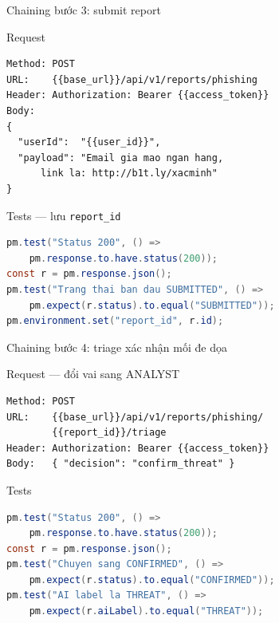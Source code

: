 \documentclass[aspectratio=169,12pt]{beamer}
\begin{document}
\begin{frame}[fragile]{Chaining bước 3: submit report}
  \begin{block}{Request}
\begin{lstlisting}[language={},basicstyle=\ttfamily\scriptsize]
Method: POST
URL:    {{base_url}}/api/v1/reports/phishing
Header: Authorization: Bearer {{access_token}}
Body:
{
  "userId":  "{{user_id}}",
  "payload": "Email gia mao ngan hang,
      link la: http://b1t.ly/xacminh"
}
\end{lstlisting}
  \end{block}

  \begin{block}{Tests --- lưu \texttt{report\_id}}
\begin{lstlisting}[language=Java,basicstyle=\ttfamily\scriptsize]
pm.test("Status 200", () =>
    pm.response.to.have.status(200));
const r = pm.response.json();
pm.test("Trang thai ban dau SUBMITTED", () =>
    pm.expect(r.status).to.equal("SUBMITTED"));
pm.environment.set("report_id", r.id);
\end{lstlisting}
  \end{block}
\end{frame}

\begin{frame}[fragile]{Chaining bước 4: triage xác nhận mối đe dọa}
  \begin{block}{Request --- đổi vai sang ANALYST}
\begin{lstlisting}[language={}]
Method: POST
URL:    {{base_url}}/api/v1/reports/phishing/
        {{report_id}}/triage
Header: Authorization: Bearer {{access_token}}
Body:   { "decision": "confirm_threat" }
\end{lstlisting}
  \end{block}

  \begin{block}{Tests}
\begin{lstlisting}[language=Java]
pm.test("Status 200", () =>
    pm.response.to.have.status(200));
const r = pm.response.json();
pm.test("Chuyen sang CONFIRMED", () =>
    pm.expect(r.status).to.equal("CONFIRMED"));
pm.test("AI label la THREAT", () =>
    pm.expect(r.aiLabel).to.equal("THREAT"));
\end{lstlisting}
  \end{block}
\end{frame}
\end{document}
